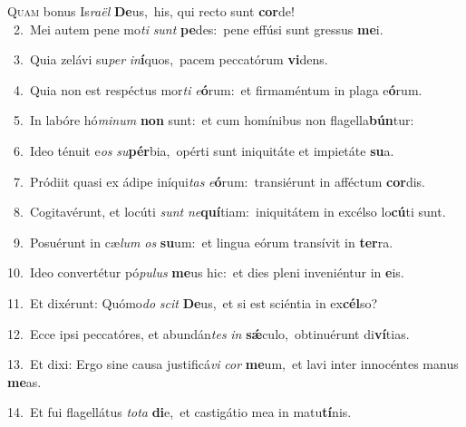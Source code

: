 \lettrine{\initial\textcolor{\initialcolor}{Q}}{uam} bonus Is\-\textit{ra}\-\textit{ël} \textbf{De}\-us,~\star his, qui recto sunt \textbf{cor}\-de!\\
{\numbfont\textcolor{\numbcolor}{~2.}}~Mei autem pene mo\textit{ti} \textit{sunt} \textbf{pe}\-des:~\star pene effúsi sunt gressus \textbf{me}\-i.\par
{\numbfont\textcolor{\numbcolor}{~3.}}~Quia zelávi su\textit{per} \textit{in}\-\textbf{í}quos,~\star pacem peccatórum \textbf{vi}\-dens.\par
{\numbfont\textcolor{\numbcolor}{~4.}}~Quia non est respéctus mor\textit{ti} \textit{e}\-\textbf{ó}rum:~\star et firmaméntum in plaga e\-\textbf{ó}\-rum.\par
{\numbfont\textcolor{\numbcolor}{~5.}}~In labóre hó\-\textit{mi}\-\textit{num} \textbf{non} sunt:~\star et cum homínibus non flagella\-\textbf{bún}\-tur:\par
{\numbfont\textcolor{\numbcolor}{~6.}}~Ideo ténuit e\textit{os} \textit{su}\-\textbf{pér}bia,~\star opérti sunt iniquitáte et impietáte \textbf{su}\-a.\par
{\numbfont\textcolor{\numbcolor}{~7.}}~Pródiit quasi ex ádipe iníqui\textit{tas} \textit{e}\-\textbf{ó}rum:~\star transiérunt in afféctum \textbf{cor}\-dis.\par
{\numbfont\textcolor{\numbcolor}{~8.}}~Cogitavérunt, et locúti \textit{sunt} \textit{ne}\-\textbf{quí}tiam:~\star iniquitátem in excélso lo\-\textbf{cú}\-ti sunt.\par
{\numbfont\textcolor{\numbcolor}{~9.}}~Posuérunt in cæ\textit{lum} \textit{os} \textbf{su}\-um:~\star et lingua eórum transívit in \textbf{ter}\-ra.\par
{\numbfont\textcolor{\numbcolor}{10.}}~Ideo convertétur pó\-\textit{pu}\-\textit{lus} \textbf{me}\-us hic:~\star et dies pleni inveniéntur in \textbf{e}\-is.\par
{\numbfont\textcolor{\numbcolor}{11.}}~Et dixérunt: Quómo\textit{do} \textit{scit} \textbf{De}\-us,~\star et si est sciéntia in ex\-\textbf{cél}\-so?\par
{\numbfont\textcolor{\numbcolor}{12.}}~Ecce ipsi peccatóres, et abundán\textit{tes} \textit{in} \textbf{sǽ}\-culo,~\star obtinuérunt di\-\textbf{ví}\-tias.\par
{\numbfont\textcolor{\numbcolor}{13.}}~Et dixi: Ergo sine causa justificá\textit{vi} \textit{cor} \textbf{me}\-um,~\star et lavi inter innocéntes manus \textbf{me}\-as.\par
{\numbfont\textcolor{\numbcolor}{14.}}~Et fui flagellátus \textit{to}\-\textit{ta} \textbf{di}\-e,~\star et castigátio mea in matu\-\textbf{tí}\-nis.\par
